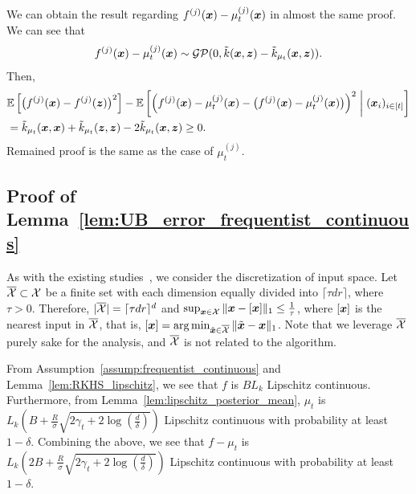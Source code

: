 We can obtain the result regarding $f^{(j)}(\boldsymbol{x}) - \mu_t^{(j)}(\boldsymbol{x})$ in almost the same proof.
%
We can see that
\begin{align*}
    f^{(j)}(\boldsymbol{x}) - \mu_t^{(j)}(\boldsymbol{x}) \sim {\cal G} {\cal P}(0, \tilde{k}(\boldsymbol{x}, \boldsymbol{z}) - \tilde{k}_{\mu_t}(\boldsymbol{x}, \boldsymbol{z})).
\end{align*}
%
Then, 
\begin{align*}
    &\mathbb{E}\left[ \bigl( f^{(j)}(\boldsymbol{x}) - f^{(j)}(\boldsymbol{z}) \bigr)^2 \right] - \mathbb{E}\left[ \left( f^{(j)}(\boldsymbol{x}) - \mu_t^{(j)}(\boldsymbol{x}) - \bigl( f^{(j)}(\boldsymbol{x}) - \mu_t^{(j)}(\boldsymbol{x}) \bigr) \right)^2 \biggm\vert (\boldsymbol{x}_i)_{i \in [t]} \right] \\
    &= \tilde{k}_{\mu_t}(\boldsymbol{x}, \boldsymbol{x}) + \tilde{k}_{\mu_t}(\boldsymbol{z}, \boldsymbol{z}) - 2\tilde{k}_{\mu_t}(\boldsymbol{x}, \boldsymbol{z})
    \geq 0.
\end{align*}
%
Remained proof is the same as the case of $\mu_t^{(j)}$.


\subsection{Proof of Lemma~\ref{lem:UB_error_frequentist_continuous}}
\label{sec:proof_UB_error_frequentist_continuous}

As with the existing studies~\citep[e.g., ][]{Srinivas2010-Gaussian}, we consider the discretization of input space.
%
Let $\overline{{\cal X}} \subset {\cal X}$ be a finite set with each dimension equally divided into $\lceil \tau d r \rceil$, where $\tau > 0$.
%
Therefore, $|\overline{{\cal X}}| = \lceil \tau d r \rceil^d$ and $\sup_{\boldsymbol{x} \in {\cal X}} \| \boldsymbol{x} - [\boldsymbol{x}] \|_1 \leq \frac{1}{\tau}$, where $[\boldsymbol{x}]$ is the nearest input in $\overline{{\cal X}}$, that is, $[\boldsymbol{x}] = \operatorname*{arg\,min}_{\tilde{\boldsymbol{x}} \in \overline{{\cal X}}} \|\tilde{\boldsymbol{x}} - \boldsymbol{x} \|_1$.
%
Note that we leverage $\overline{{\cal X}}$ purely sake for the analysis, and $\overline{{\cal X}}$ is not related to the algorithm.


From Assumption~\ref{assump:frequentist_continuous} and Lemma~\ref{lem:RKHS_lipschitz}, we see that $f$ is $B L_k$ Lipschitz continuous.
%
Furthermore, from Lemma~\ref{lem:lipschitz_posterior_mean}, $\mu_t$ is $L_k \left( B + \frac{R}{\sigma} \sqrt{ 2 \gamma_t + 2 \log \left( \frac{d}{\delta} \right)} \right)$ Lipschitz continuous with probability at least $1 - \delta$.
%
Combining the above, we see that $f - \mu_t$ is $L_k \left( 2B + \frac{R}{\sigma} \sqrt{ 2 \gamma_t + 2 \log \left( \frac{d}{\delta} \right)} \right)$ Lipschitz continuous with probability at least $1 - \delta$.

